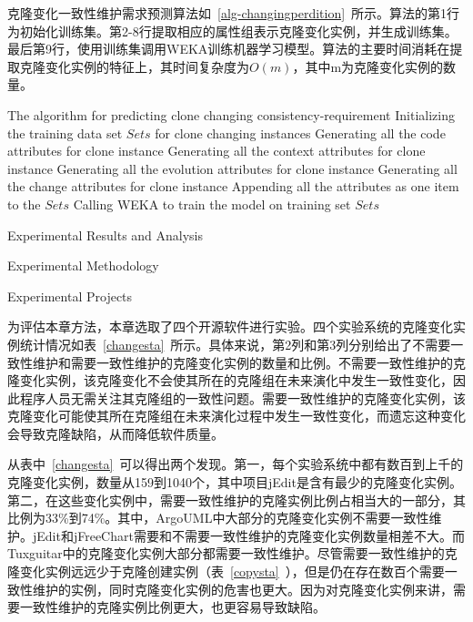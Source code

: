 克隆变化一致性维护需求预测算法如~\ref{alg-changingperdition}~所示。算法的第1行为初始化训练集。第2-8行提取相应的属性组表示克隆变化实例，并生成训练集。最后第9行，使用训练集调用WEKA训练机器学习模型。算法的主要时间消耗在提取克隆变化实例的特征上，其时间复杂度为$O(m)$，其中m为克隆变化实例的数量。

\begin{minipage}{0.8\textwidth}
\centering
\begin{algorithm}[H]
 {The algorithm for predicting clone changing consistency-requirement}
\label{alg-changingperdition}
Initializing the training data set $Sets$ for clone changing instances\; 
{ 
Generating all the code attributes for clone instance\;
Generating all the context attributes for clone instance\;
Generating all the evolution attributes for clone instance\;
Generating all the change attributes for clone instance\;
Appending all the attributes as one item to the $Sets$\;
}
Calling WEKA to train the model on training set $Sets$\;
\end{algorithm}
\end{minipage}

{Experimental Results and Analysis}

{Experimental Methodology}

{Experimental Projects}

为评估本章方法，本章选取了四个开源软件进行实验。四个实验系统的克隆变化实例统计情况如表~\ref{changesta}~所示。具体来说，第2列和第3列分别给出了不需要一致性维护和需要一致性维护的克隆变化实例的数量和比例。不需要一致性维护的克隆变化实例，该克隆变化不会使其所在的克隆组在未来演化中发生一致性变化，因此程序人员无需关注其克隆组的一致性问题。需要一致性维护的克隆变化实例，该克隆变化可能使其所在克隆组在未来演化过程中发生一致性变化，而遗忘这种变化会导致克隆缺陷，从而降低软件质量。

从表中~\ref{changesta}~可以得出两个发现。第一，每个实验系统中都有数百到上千的克隆变化实例，数量从159到1040个，其中项目{jEdit}是含有最少的克隆变化实例。第二，在这些变化实例中，需要一致性维护的克隆实例比例占相当大的一部分，其比例为33\%到74\%。其中，ArgoUML中大部分的克隆变化实例不需要一致性维护。jEdit和jFreeChart需要和不需要一致性维护的克隆变化实例数量相差不大。而Tuxguitar中的克隆变化实例大部分都需要一致性维护。尽管需要一致性维护的克隆变化实例远远少于克隆创建实例（表~\ref{copysta}~），但是仍在存在数百个需要一致性维护的实例，同时克隆变化实例的危害也更大。因为对克隆变化实例来讲，需要一致性维护的克隆实例比例更大，也更容易导致缺陷。

